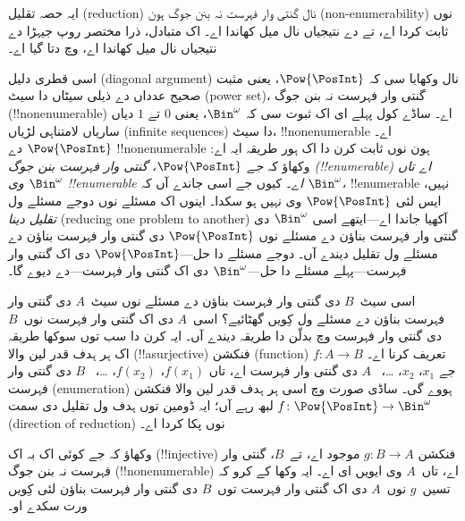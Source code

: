 \documentclass[../../../include/open-logic-section]{subfiles}
\begin{document}


\begin{editorial}
  ایہ حصہ تقلیل (reduction) نال گنتی وار فہرست نہ بنن جوگ ہون
  (non-enumerability) نوں ثابت کردا اے،
  تے  دے نتیجیاں نال میل کھاندا اے۔ اک متبادل، ذرا
  مختصر روپ جیہڑا  دے نتیجیاں نال میل کھاندا اے،
   وچ دتا گیا اے۔
\end{editorial}

اسی قطری دلیل (diagonal argument) نال وکھایا سی کہ $\Pow{\PosInt}$،
یعنی مثبت صحیح عدداں دے ذیلی سیٹاں دا سیٹ (power set)، گنتی وار فہرست
نہ بنن جوگ (!!{nonenumerable}) اے۔ ساڈے کول پہلے ای اک ثبوت سی کہ
$\Bin^\omega$، یعنی $0$ تے $1$ دیاں ساریاں لامتناہی لڑیاں
(infinite sequences) دا سیٹ، !!{nonenumerable} اے۔ $\Pow{\PosInt}$
دے !!{nonenumerable} ہون نوں ثابت کرن دا اک ہور طریقہ ایہ اے: وکھاؤ
کہ \emph{جے $\Pow{\PosInt}$، گنتی وار فہرست بنن جوگ
(!!{enumerable}) اے تاں $\Bin^\omega$ وی !!{enumerable} اے}۔ کیوں جے
اسی جاندے آں کہ $\Bin^\omega$، !!{enumerable} نہیں، ایس لئی
$\Pow{\PosInt}$ وی نہیں ہو سکدا۔ اینوں اک مسئلے نوں دوجے مسئلے ول
\emph{تقلیل دینا} (reducing one problem to another) آکھیا
جاندا اے---ایتھے اسی $\Bin^\omega$ دی گنتی وار فہرست بناؤن دے مسئلے
نوں $\Pow{\PosInt}$ دی گنتی وار فہرست بناؤن دے مسئلے ول تقلیل دیندے
آں۔ دوجے مسئلے دا حل---$\Pow{\PosInt}$ دی اک گنتی وار فہرست---پہلے
مسئلے دا حل---$\Bin^\omega$ دی اک گنتی وار فہرست---دے دیوے گا۔

اسی سیٹ~$B$ دی گنتی وار فہرست بناؤن دے مسئلے نوں سیٹ~$A$ دی گنتی
وار فہرست بناؤن دے مسئلے ول کِویں گھٹائیے؟ اسی~$A$ دی اک گنتی وار
فہرست نوں~$B$ دی گنتی وار فہرست وچ بدلّن دا طریقہ دیندے آں۔ ایہ کرن
دا سب توں سوکھا طریقہ اک ہر ہدف قدر لین والا (!!a{surjective}) فنکشن
(function)
$f\colon A \to B$ تعریف کرنا اے۔ جے $x_1$، $x_2$، \dots{}،
~$A$ دی گنتی وار فہرست اے، تاں $f(x_1)$، $f(x_2)$، \dots{}،
~$B$ دی گنتی وار فہرست (enumeration) ہووے گی۔ ساڈی صورت وچ اسی ہر
ہدف قدر لین والا فنکشن $f\colon \Pow{\PosInt} \to \Bin^\omega$ لبھ
رہے آں؛ ایہ ڈومین توں ہدف ول تقلیل دی سمت (direction of reduction)
نوں پکا کردا اے۔

\begin{prob}
وکھاؤ کہ جے کوئی اک بہ اک (!!{injective}) فنکشن $g\colon B \to A$
موجود اے، تے~$B$، گنتی وار فہرست نہ بنن جوگ (!!{nonenumerable}) اے،
تاں~$A$ وی ایویں ای اے۔ ایہ وکھا کے
کرو کہ تسیں~$g$ نوں~$A$ دی اک گنتی وار فہرست توں~$B$ دی گنتی وار
فہرست بناؤن لئی کِویں ورت سکدے او۔
\end{prob}
\end{document}
